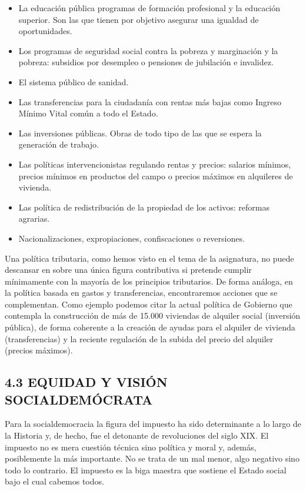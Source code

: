 \documentclass[
]{article}
\begin{document}
\begin{itemize}
\item
  La educación pública programas de formación profesional y la educación
  superior. Son las que tienen por objetivo asegurar una igualdad de
  oportunidades.
\item
  Los programas de seguridad social contra la pobreza y marginación y la
  pobreza: subsidios por desempleo o pensiones de jubilación e
  invalidez.
\item
  El sistema público de sanidad.
\item
  Las transferencias para la ciudadanía con rentas más bajas como
  Ingreso Mínimo Vital común a todo el Estado.
\item
  Las inversiones públicas. Obras de todo tipo de las que se espera la
  generación de trabajo.
\item
  Las políticas intervencionistas regulando rentas y precios: salarios
  mínimos, precios mínimos en productos del campo o precios máximos en
  alquileres de vivienda.
\item
  Las política de redistribución de la propiedad de los activos:
  reformas agrarias.
\item
  Nacionalizaciones, expropiaciones, confiscaciones o reversiones.
\end{itemize}

Una política tributaria, como hemos visto en el tema de la asignatura,
no puede descansar en sobre una única figura contributiva si pretende
cumplir mínimamente con la mayoría de los principios tributarios. De
forma análoga, en la política basada en gastos y transferencias,
encontraremos acciones que se complementan. Como ejemplo podemos citar
la actual política de Gobierno que contempla la construcción de más de
15.000 viviendas de alquiler social (inversión pública), de forma
coherente a la creación de ayudas para el alquiler de vivienda
(transferencias) y la reciente regulación de la subida del precio del
alquiler (precios máximos).

\hypertarget{equidad-y-visiuxf3n-socialdemuxf3crata}{%
\subsection*{4.3 EQUIDAD Y VISIÓN
SOCIALDEMÓCRATA}\label{equidad-y-visiuxf3n-socialdemuxf3crata}}

Para la socialdemocracia la figura del impuesto ha sido determinante a
lo largo de la Historia y, de hecho, fue el detonante de revoluciones
del siglo XIX. El impuesto no es mera cuestión técnica sino política y
moral y, además, posiblemente la más importante. No se trata de un mal
menor, algo negativo sino todo lo contrario. El impuesto es la biga
maestra que sostiene el Estado social bajo el cual cabemos todos.
\end{document}
